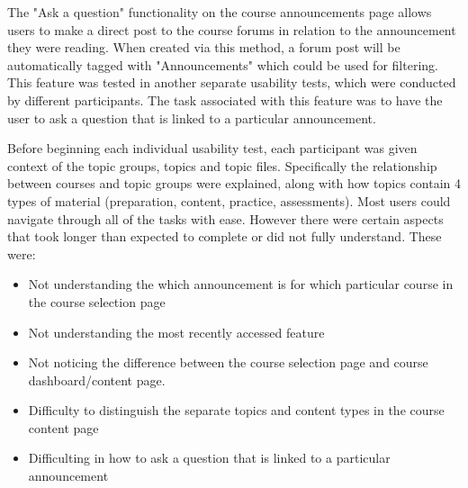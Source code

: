 The "Ask a question" functionality on the course announcements page allows users to make a direct post to the course forums in relation to the announcement they were reading.
When created via this method, a forum post will be automatically tagged with "Announcements" which could be used for filtering.
This feature was tested in another separate usability tests, which were conducted by different participants.
The task associated with this feature was to have the user to ask a question that is linked to a particular announcement.

Before beginning each individual usability test, each participant was given context of the topic groups, topics and topic files. Specifically the relationship between courses and topic groups were explained, along with how topics contain 4 types of material (preparation, content, practice, assessments).
Most users could navigate through all of the tasks with ease. However there were certain aspects that took longer than expected to complete or did not fully understand.
These were:
\begin{itemize}
    \item Not understanding the which announcement is for which particular course in the course selection page
    \item Not understanding the most recently accessed feature
    \item Not noticing the difference between the course selection page and course dashboard/content page.
    \item Difficulty to distinguish the separate topics and content types in the course content page
    \item Difficulting in how to ask a question that is linked to a particular announcement
\end{itemize}

